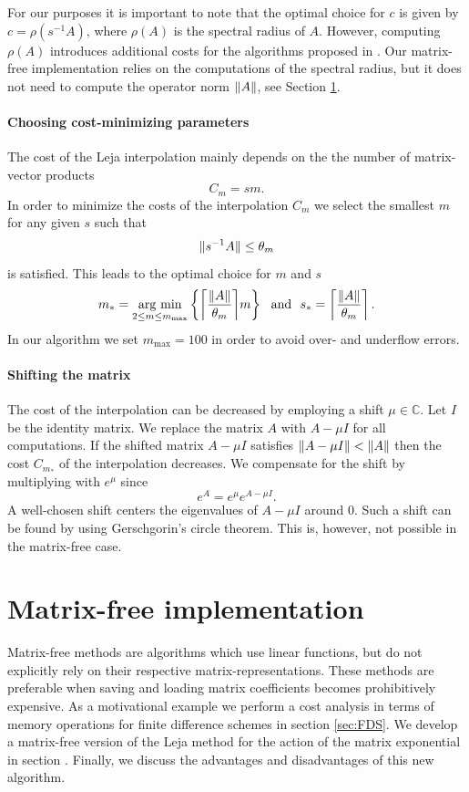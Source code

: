 \documentclass{scrartcl}
\begin{document}
	For our purposes it is important to note that the optimal choice for $c$ is given by $c=\rho(s^{-1}A)$, where $\rho(A)$ is the spectral radius of $A$. However, computing $\rho(A)$ introduces additional costs for the algorithms proposed in \cite{lejarev}. Our matrix-free implementation relies on the computations of the spectral radius, but it does not need to compute the operator norm $\lVert A\rVert$, see Section \ref{sec:matrixfreeimplementation}.
	
	\paragraph{Choosing cost-minimizing parameters}
	The cost of the Leja interpolation mainly depends on the the number of matrix-vector products
	\[
	C_{m} = sm. 
	\]
	In order to minimize the costs of the interpolation $C_m$ we select the smallest $m$ for any given $s$ such that
	\[
	\lVert s^{-1}A\rVert \le \theta_m
	\]
	is satisfied. This leads to the optimal choice for $m$ and $s$ 
	\begin{align}
	\begin{split}
	m_* = \underset{2\le m\le m_{\operatorname{max}}}{\operatorname{arg\ min}}  \left\{{\left\lceil{\frac{\norm{A}}{\theta_m}}\right\rceil}m\right\} ~~\text{and}~~
	s_* =  \left\lceil{\frac{\norm{A}}{\theta_m}}\right\rceil.
	\end{split} \label{eq:ms}
	\end{align}
	In our algorithm we set $m_{\operatorname{max}} = 100$ in order to avoid over- and underflow errors.
	
	\paragraph{Shifting the matrix}
	The cost of the interpolation can be decreased by employing a shift $\mu\in\mathbb{C}$. Let $I$ be the identity matrix. We replace the matrix $A$ with $A-\mu I$ for all computations. If the shifted matrix $A-\mu I$ satisfies $\lVert A -\mu I\rVert < \lVert A\rVert$ then the cost $C_{m_*}$ of the interpolation decreases.
	We compensate for the shift by multiplying with $e^\mu$ since
	\[
	e^{A} = e^{\mu}e^{A-\mu I}.
	\]
	A well-chosen shift centers the eigenvalues of $A-\mu I$ around $0$. Such a shift can be found by using Gerschgorin's circle theorem. This is, however, not possible in the matrix-free case.
	
	\section{Matrix-free implementation}\label{sec:matrixfreeimplementation}
Matrix-free methods are algorithms which use linear functions, but do not explicitly rely on their respective matrix-representations. These methods are preferable when saving and loading matrix coefficients becomes prohibitively expensive. As a motivational example we perform a cost analysis in terms of memory operations for finite difference schemes in section \ref{sec:FDS}.
We develop a matrix-free version of the Leja method for the action of the matrix exponential in section \label{sec:MatrixFreeLejaMethod}. Finally, we discuss the advantages and disadvantages of this new algorithm.
\end{document}
